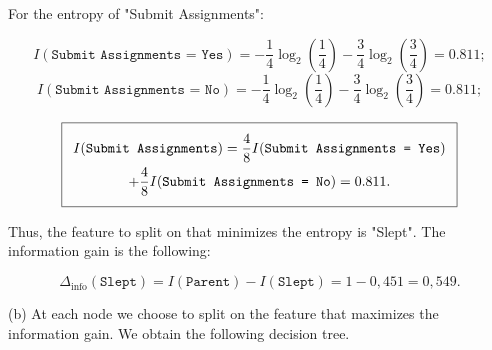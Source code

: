 For the entropy of "Submit Assignments":

\begin{center}
\end{center}

\[
   I(\texttt{Submit Assignments = Yes}) = -\frac{1}{4}\log_2(\frac{1}{4}) -\frac{3}{4}\log_2(\frac{3}{4}) = 0.811 ;
\]
\[
   I(\texttt{Submit Assignments = No}) = -\frac{1}{4}\log_2(\frac{1}{4}) -\frac{3}{4}\log_2(\frac{3}{4}) = 0.811 ;
\]

\begin{equation*}
    \addtolength{\fboxsep}{5pt}
    \boxed{
    \begin{gathered}
         I(\texttt{Submit Assignments}) = \frac{4}{8}I(\texttt{Submit Assignments = Yes}) \\
         + \frac{4}{8}I(\texttt{Submit Assignments = No}) = 0.811.
    \end{gathered}
    }
\end{equation*}

Thus, the feature to split on that minimizes the entropy is "Slept". The information gain is the following:

\[
    \boxed{
    \Delta_{\text{info}}(\texttt{Slept}) = I(\texttt{Parent}) - I(\texttt{Slept}) = 1 - 0,451 = 0,549.
    }
\]

(b) At each node we choose to split on the feature that maximizes the information gain. We obtain the following decision tree.

